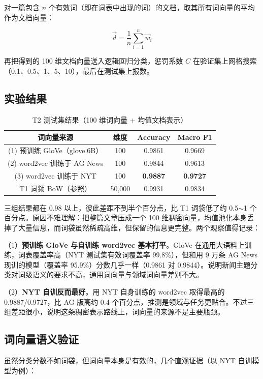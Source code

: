 \documentclass[UTF8,a4paper,10pt]{ctexart}
\begin{document}
对一篇包含 $n$ 个有效词（即在词表中出现的词）的文档，取其所有词向量的平均作为文档向量：

$$\vec{d} = \frac{1}{n}\sum_{i=1}^{n} \vec{w}_i$$

再把得到的 100 维文档向量送入逻辑回归分类，惩罚系数 $C$ 在验证集上网格搜索（0.1、0.5、1、5、10），最后在测试集上报数。

\subsection{实验结果}

\begin{table}[htbp]
\centering
\caption{T2 测试集结果（100 维词向量 + 均值文档表示）}
\label{tab:t2}
\begin{tabular}{cccc}
\toprule
\textbf{词向量来源} & \textbf{维度} & \textbf{Accuracy} & \textbf{Macro F1} \\
\midrule
(1) 预训练 GloVe（glove.6B） & 100 & 0.9861 & 0.9669 \\
(2) word2vec 训练于 AG News & 100 & 0.9844 & 0.9613 \\
(3) word2vec 训练于 NYT & 100 & \textbf{0.9887} & \textbf{0.9727} \\
\midrule
T1 词频 BoW（参照） & 50,000 & 0.9931 & 0.9834 \\
\bottomrule
\end{tabular}
\end{table}

三组结果都在 0.98 以上，彼此差距不到半个百分点，比 T1 词袋低了约 0.5$\sim$1 个百分点。原因不难理解：把整篇文章压成一个 100 维稠密向量，均值池化本身丢掉了大量信息，而词袋虽然稀疏高维，但保留的信息更完整。两个观察值得记录：

（1）\textbf{预训练 GloVe 与自训练 word2vec 基本打平}。GloVe 在通用大语料上训练，词表覆盖率高（NYT 测试集有效词覆盖率 99.8\%），但和用 9 万条 AG News 现训的模型（覆盖率 95.9\%）分数几乎一样（0.9861 对 0.9844）。说明新闻主题分类对词级语义的要求不高，通用词向量与领域词向量差别不大。

（2）\textbf{NYT 自训反而最好}。用 NYT 自身训练的 word2vec 取得最高的 0.9887/0.9727，比 AG 版高约 0.4 个百分点，推测是领域与任务更贴合。不过三组差距很小，说明这条稠密表示路线上，词向量的来源不是主要瓶颈。

\subsection{词向量语义验证}

虽然分类分数不如词袋，但词向量本身是有效的，几个直观证据（以 NYT 自训模型为例）：
\end{document}
